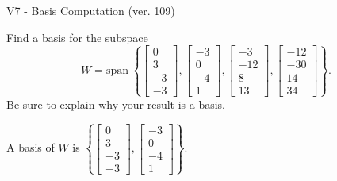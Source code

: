 \begin{exercise}
  \begin{exerciseTitle}V7 - Basis Computation (ver. 109)\end{exerciseTitle}
  \begin{exerciseStatement}
    Find a basis for the subspace 
\[W=\mathrm{span}\ \left\{\left[\begin{array}{r}
0 \\
3 \\
-3 \\
-3
\end{array}\right] , \left[\begin{array}{r}
-3 \\
0 \\
-4 \\
1
\end{array}\right] , \left[\begin{array}{r}
-3 \\
-12 \\
8 \\
13
\end{array}\right] , \left[\begin{array}{r}
-12 \\
-30 \\
14 \\
34
\end{array}\right]\right\}.\]
 Be sure to explain why your result is a basis.


  \end{exerciseStatement}
  \begin{exerciseAnswer}
   A basis of \(W\) is  \(\left\{\left[\begin{array}{r}
0 \\
3 \\
-3 \\
-3
\end{array}\right] , \left[\begin{array}{r}
-3 \\
0 \\
-4 \\
1
\end{array}\right]\right\}\).
  


  \end{exerciseAnswer}
\end{exercise}